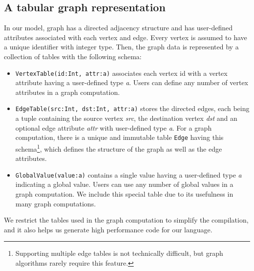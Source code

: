 \documentclass{sokendai_thesis} %
\begin{document}
\subsection{A tabular graph representation}
\label{sec:representation}

In our model, graph has a directed adjacency structure and has user-defined attributes associated with each vertex and edge.
Every vertex is assumed to have a unique identifier with integer type.
Then, the graph data is represented by a collection of tables with the following schema:
\begin{itemize}
  \item
    \texttt{VertexTable(id:Int, attr:a)} associates each vertex id with a vertex attribute having a user-defined type \textit{a}.
    Users can define any number of vertex attributes in a graph computation.
  \item
    \texttt{EdgeTable(src:Int, dst:Int, attr:a)} stores the directed edges, each being a tuple containing the source vertex \textit{src}, the destination vertex \textit{dst} and an optional edge attribute \textit{attr} with user-defined type \textit{a}.
    For a graph computation, there is a unique and immutable table \texttt{Edge} having this schema\footnote{Supporting multiple edge tables is not technically difficult, but graph algorithms rarely require this feature.}, which defines the structure of the graph as well as the edge attributes.
  \item
    \texttt{GlobalValue(value:a)} contains a single value having a user-defined type \textit{a} indicating a global value.
    Users can use any number of global values in a graph computation.
    We include this special table due to its usefulness in many graph computations.
\end{itemize}

We restrict the tables used in the graph computation to simplify the compilation, and it also helps us generate high performance code for our language.
\end{document}

